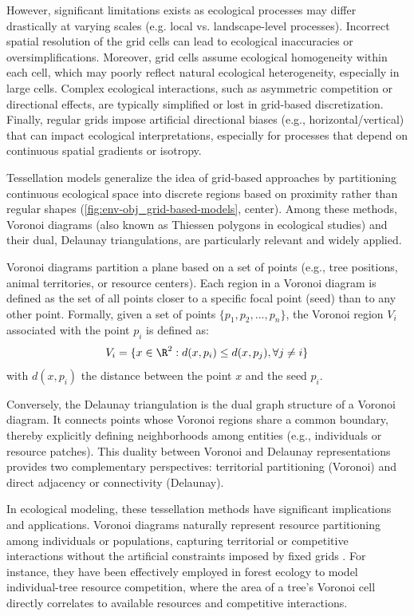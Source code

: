 However, significant limitations exists as ecological processes may differ drastically at varying scales (e.g. local vs. landscape-level processes). Incorrect spatial resolution of the grid cells can lead to ecological inaccuracies or oversimplifications. Moreover, grid cells assume ecological homogeneity within each cell, which may poorly reflect natural ecological heterogeneity, especially in large cells. Complex ecological interactions, such as asymmetric competition or directional effects, are typically simplified or lost in grid-based discretization. Finally, regular grids impose artificial directional biases (e.g., horizontal/vertical) that can impact ecological interpretations, especially for processes that depend on continuous spatial gradients or isotropy.

Tessellation models generalize the idea of grid-based approaches by partitioning continuous ecological space into discrete regions based on proximity rather than regular shapes (\cref{fig:env-obj_grid-based-models}, center). Among these methods, Voronoi diagrams (also known as Thiessen polygons in ecological studies) and their dual, Delaunay triangulations, are particularly relevant and widely applied.

Voronoi diagrams partition a plane based on a set of points (e.g., tree positions, animal territories, or resource centers). Each region in a Voronoi diagram is defined as the set of all points closer to a specific focal point (seed) than to any other point. Formally, given a set of points $\{p_1, p_2, ..., p_n\}$, the Voronoi region $V_i$ associated with the point $p_i$ is defined as:
\begin{align}
    V_i = \{ x \in \R^2 : d(x, p_i) \leq d(x, p_j), \forall j \neq i \}
\end{align}
with $d(x, p_i)$ the distance between the point $x$ and the seed $p_i$.

Conversely, the Delaunay triangulation is the dual graph structure of a Voronoi diagram. It connects points whose Voronoi regions share a common boundary, thereby explicitly defining neighborhoods among entities (e.g., individuals or resource patches). This duality between Voronoi and Delaunay representations provides two complementary perspectives: territorial partitioning (Voronoi) and direct adjacency or connectivity (Delaunay).

In ecological modeling, these tessellation methods have significant implications and applications. Voronoi diagrams naturally represent resource partitioning among individuals or populations, capturing territorial or competitive interactions without the artificial constraints imposed by fixed grids \cite{Castle2006}. For instance, they have been effectively employed in forest ecology to model individual-tree resource competition, where the area of a tree's Voronoi cell directly correlates to available resources and competitive interactions.


